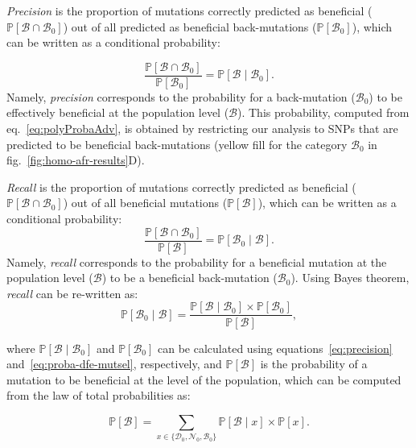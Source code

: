 \documentclass{article}
\newcommand{\proba}{\mathbb{P}}
\newcommand{\SphyDel}{\mathcal{D}_0}
\newcommand{\SphyNeu}{\mathcal{N}_0}
\newcommand{\SphyBen}{\mathcal{B}_0}
\newcommand{\Sphyclass}{x}
\newcommand{\given}{\mid}
\newcommand{\SpopBen}{\mathcal{B}}
\newcommand{\ProbaPopBen}{\proba [ \SpopBen ]}
\begin{document}
    \textit{Precision} is the proportion of mutations correctly predicted as beneficial ($\proba [ \SpopBen \cap  \SphyBen]$) out of all predicted as beneficial back-mutations ($\proba [ \SphyBen]$), which can be written as a conditional probability:

    \begin{equation}
        \frac{\proba [ \SpopBen  \cap  \SphyBen]}{\proba [ \SphyBen]} = \proba [ \SpopBen  \given  \SphyBen].
        \label{eq:precision}
    \end{equation}
    Namely, \textit{precision} corresponds to the probability for a back-mutation ($\SphyBen$) to be effectively beneficial at the population level ($\SpopBen$).
    This probability, computed from eq.~\ref{eq:polyProbaAdv}, is obtained by restricting our analysis to SNPs that are predicted to be beneficial back-mutations (yellow fill for the category $\SphyBen$ in fig.~\ref{fig:homo-afr-results}D).

    \textit{Recall} is the proportion of mutations correctly predicted as beneficial ($\proba [ \SpopBen \cap  \SphyBen]$) out of all beneficial mutations ($\proba [ \SpopBen]$), which can be written as a conditional probability:
    \begin{equation}
        \frac{\proba [ \SpopBen \cap  \SphyBen]}{\proba [ \SpopBen]} = \proba [ \SphyBen  \given \SpopBen ].
    \end{equation}
    Namely, \textit{recall} corresponds to the probability for a beneficial mutation at the population level ($\SpopBen$) to be a beneficial back-mutation ($\SphyBen$).
    Using Bayes theorem, \textit{recall} can be re-written as:
    \begin{equation}
        \proba [\SphyBen \given \SpopBen] = \frac{\proba [\SpopBen \given \SphyBen] \times \proba[\SphyBen]}{\ProbaPopBen},
        \label{eq:bayes}
    \end{equation}

    where $\proba [\SpopBen \given \SphyBen]$ and $\proba [ \SphyBen ]$ can be calculated using equations~\ref{eq:precision} and~\ref{eq:proba-dfe-mutsel}, respectively, and $\proba [ \SpopBen ]$ is the probability of a mutation to be beneficial at the level of the population, which can be computed from the law of total probabilities as:

    \begin{equation}
        \proba [ \SpopBen ] = \sum_{\Sphyclass \in \{\SphyDel, \SphyNeu, \SphyBen \} }\proba [\SpopBen \given \Sphyclass ] \times \proba [\Sphyclass ].
        \label{eq:total_proba}
    \end{equation}
\end{document}
